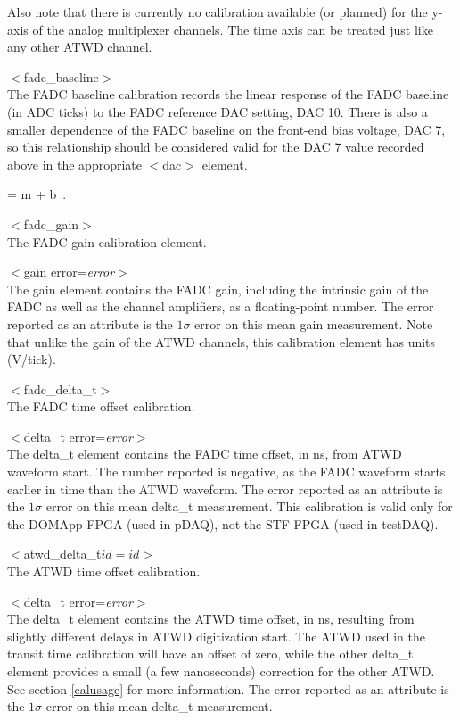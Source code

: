\documentclass[10pt]{article}
\begin{document}
Also note that there is currently no calibration available (or planned) for
the y-axis of the analog multiplexer channels.  The time axis can be
treated just like any other ATWD channel.


\item{$<$fadc\_baseline$>$}\\
The FADC baseline calibration records the linear response of the FADC
baseline (in ADC ticks) to the FADC reference DAC setting, DAC 10.  There
is also a smaller dependence of the FADC baseline on the front-end
bias voltage, DAC 7, so this relationship should be considered valid for
the DAC 7 value recorded above in the appropriate $<$dac$>$ element.

\be
{} = m \cdot {} + b\ .
\ee


\item{$<$fadc\_gain$>$}\\
The FADC gain calibration element.
\bi
\item{$<$gain error=\textit{error}$>$}\\
The gain element contains the FADC gain, including the intrinsic gain of
the FADC as well as the channel amplifiers, as a floating-point number.
The error reported as an attribute is the $1\sigma$ error on this mean gain
measurement.  Note that unlike the gain of the ATWD channels, this
calibration element has units (V/tick).
\ei


\item{$<$fadc\_delta\_t$>$}\\
The FADC time offset calibration.
\bi
\item{$<$delta\_t error=\textit{error}$>$}\\
The delta\_t element contains the FADC time offset, in ns, from ATWD
waveform start.  The number reported is negative, as the FADC waveform starts
earlier in time than the ATWD waveform.   The error reported as an attribute
is the $1\sigma$ error on this mean delta\_t measurement.  This calibration is
valid only for the DOMApp FPGA (used in pDAQ), not the STF FPGA (used
in testDAQ).  
\ei


\item{$<$atwd\_delta\_t$ id=\textit{id}>$}\\
The ATWD time offset calibration.
\bi
\item{$<$delta\_t error=\textit{error}$>$}\\
The delta\_t element contains the ATWD time offset, in ns, resulting from slightly different 
delays in ATWD digitization start.  The ATWD used in the transit time calibration will have
an offset of zero, while the other delta\_t element provides a small (a few nanoseconds) correction
for the other ATWD.  See section \ref{calusage} 
for more information.  The error reported as an attribute
is the $1\sigma$ error on this mean delta\_t measurement.
\ei
\end{document}
